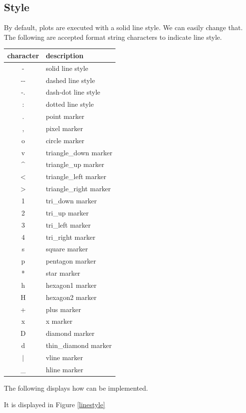 \subsection*{Style}
By default, plots are executed with a solid line style. We can easily change that. The following are accepted format string characters to indicate line style. 

\begin{tabular}
{|c||l|}
\hline
character & description \\
\hline
- & solid line style \\
-{}- & dashed line style\\
-. & dash-dot line style \\
: & dotted line style \\
. & point marker \\
, & pixel marker \\
o & circle marker \\
v & triangle\_down marker \\
\^{} & triangle\_up marker \\
$<$ & triangle\_left marker \\
$>$ & triangle\_right marker \\
1 & tri\_down marker \\
2 & tri\_up marker \\
3 & tri\_left marker \\
4 & tri\_right marker \\
s & square marker \\
p & pentagon marker \\
* & star marker \\
h & hexagon1 marker \\
H & hexagon2 marker \\
+ & plus marker \\
x & x marker \\
D & diamond marker \\
d & thin\_diamond marker \\
$|$ & vline marker \\
\_{} & hline marker \\
\hline 
\end{tabular}


The following displays how  can be implemented. 

It is displayed in Figure \ref{linestyle}


